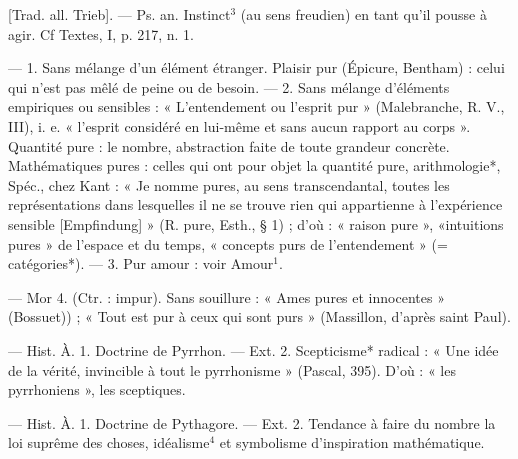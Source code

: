 \begin{itemize}[leftmargin=1cm, label=, itemsep=1pt]
 [Trad. all. Trieb]. — Ps. an.
Instinct$^3$ (au sens freudien) en tant
qu'il pousse à agir. Cf Textes, I,
p. 217, n. 1.

 — 1. Sans mélange d’un élément
étranger. Plaisir pur (Épicure, Bentham) : celui qui n’est pas mêlé de
peine ou de besoin. — 2. Sans mélange d’éléments empiriques ou
sensibles : « L’entendement ou l’esprit pur » (Malebranche, R. V., III),
i. e. « l'esprit considéré en lui-même
et sans aucun rapport au corps ».
Quantité pure : le nombre, abstraction faite de toute grandeur concrète. Mathématiques pures : celles
qui ont pour objet la quantité pure,
arithmologie*, Spéc., chez Kant :
« Je nomme pures, au sens transcendantal, toutes les représentations dans lesquelles il ne se trouve
rien qui appartienne à l'expérience
sensible [Empfindung] » (R. pure,
Esth., § 1) ; d’où : « raison pure »,
«intuitions pures » de l'espace et du
temps, « concepts purs de l’entendement » (= catégories*). — 3. Pur
amour : voir Amour$^1$.

— Mor 4. (Ctr. : impur). Sans
souillure : « Ames pures et innocentes » (Bossuet)) ; « Tout est pur
à ceux qui sont purs » (Massillon,
d’après saint Paul).

 — Hist. À. 1. Doctrine
de Pyrrhon. — Ext. 2. Scepticisme*
radical : « Une idée de la vérité,
invincible à tout le pyrrhonisme »
(Pascal, 395). D'où : « les pyrrhoniens », les sceptiques.

 — Hist. À. 1. Doctrine
de Pythagore. — Ext. 2. Tendance
à faire du nombre la loi suprême des
choses, idéalisme$^4$ et symbolisme
d'inspiration mathématique.

	\end{itemize}
